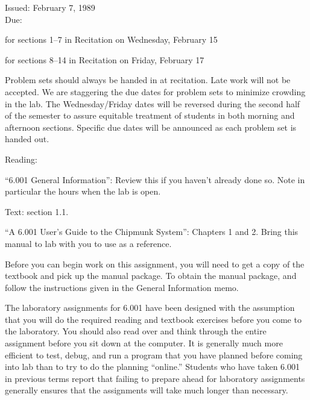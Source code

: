 




\medskip

\begin{flushleft}
Issued:  February 7, 1989 \\
\smallskip
Due:
\begin{tightlist}
\item for sections 1--7 in Recitation on Wednesday, February 15
\item for sections 8--14 in Recitation on Friday, February 17
\end{tightlist}
\end{flushleft}

\noindent
{\small
Problem sets should always be handed in at recitation.  Late work will
not be accepted.  We are staggering the due dates for problem sets to
minimize crowding in the lab.  The Wednesday/Friday dates will be
reversed during the second half of the semester to assure equitable
treatment of students in both morning and afternoon sections.
Specific due dates will be announced as each problem set is handed
out. }

\begin{flushleft}
Reading: 
\begin{tightlist}

\item ``6.001 General Information'': Review this if you haven't
already done so.  Note in particular the hours when the lab is open.

\item Text: section 1.1.

\item  ``A 6.001 User's Guide to the Chipmunk System'': Chapters 1
and 2.  Bring this manual to lab with you to use as a reference.
\end{tightlist}
\end{flushleft}

Before you can begin work on this assignment, you will need to get a
copy of the textbook and pick up the manual package.  To obtain the
manual package, and follow the instructions given in the General
Information memo.

The laboratory assignments for 6.001 have been designed with the
assumption that you will do the required reading and textbook
exercises before you come to the laboratory.  You should also read
over and think through the entire assignment before you sit down at
the computer.  It is generally much more efficient to test, debug, and
run a program that you have planned before coming into lab than to try
to do the planning ``online.''  Students who have taken 6.001 in
previous terms report that failing to prepare ahead for laboratory
assignments generally ensures that the assignments will take much
longer than necessary.


